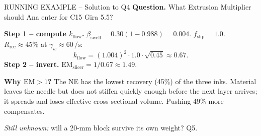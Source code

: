 \documentclass[11pt,a4paper]{article}
\newcommand{\gd}{\dot{\gamma}}
\begin{document}
\begin{runningbox}{RUNNING EXAMPLE -- Solution to Q4}
\textbf{Question.} What Extrusion Multiplier should Ana enter for
C15 Gira 5.5?

\medskip\textbf{Step 1 -- compute $k_\mathrm{flow}$.}
$\beta_\mathrm{swell}=0.30(1-0.988)=0.004$. $f_\mathrm{slip}=1.0$.
$R_\mathrm{rec}\approx 45\%$ at $\gd_w\approx 60\,\si{\per\s}$:
\[
k_\mathrm{flow} = (1.004)^2\cdot 1.0\cdot\sqrt{0.45} \approx 0.67.
\]
\textbf{Step 2 -- invert.} $\mathrm{EM}_\mathrm{slicer}=1/0.67\approx\mathbf{1.49}$.

\textbf{Why $\mathrm{EM}>1$?} The NE has the lowest recovery (45\%)
of the three inks. Material leaves the needle but does not stiffen
quickly enough before the next layer arrives; it spreads and loses
effective cross-sectional volume. Pushing 49\% more compensates.

\medskip\emph{Still unknown:} will a 20-mm block survive its own
weight? Q5.
\end{runningbox}
\end{document}
